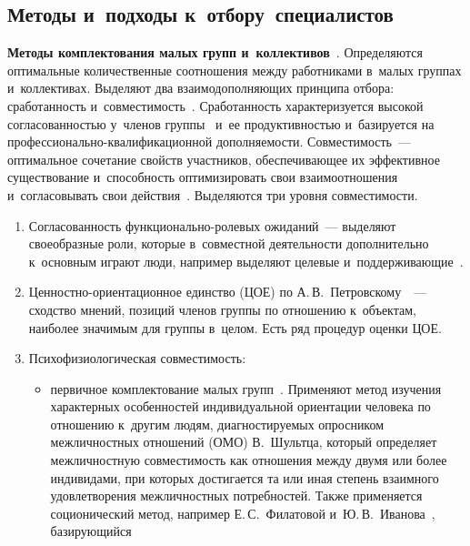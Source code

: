 \begin{multicols}{2}
\section{Методы и~подходы к~отбору~специалистов }

  \textbf{Методы комплектования малых групп и~коллективов}~\cite{13-r}. 
Определяются оптимальные количественные соотношения между работниками 
в~малых группах и~коллективах. Выделяют два взаимодополняющих принципа 
отбора: сра\-бо\-тан\-ность и~со\-вмес\-ти\-мость~\cite{14-r}. Сра\-бо\-тан\-ность 
характеризуется высокой со\-гла\-со\-ван\-ностью у~членов группы~\cite{15-r} и~ее\linebreak 
про\-дук\-тив\-ностью и~базируется на  
про\-фес\-сио\-наль\-но-ква\-ли\-фи\-ка\-ци\-он\-ной до\-пол\-ня\-емости. 
Совместимость~--- оптимальное сочетание свойств участников, 
обес\-пе\-чи\-ва\-ющее их эффективное \mbox{существование} и~спо\-соб\-ность 
оптимизировать свои взаимоотношения и~согласовывать свои 
действия~\cite{15-r}. Выделяются три уровня со\-вмес\-ти\-мости.\\[-14pt]
  \begin{enumerate}[1.]
\item Согласованность функ\-ци\-о\-наль\-но-ро\-ле\-вых ожи\-да\-ний~--- выделяют 
своеобразные роли, которые в~совместной дея\-тель\-ности дополнительно 
к~основным играют люди, например выделяют целевые и~под\-дер\-жи\-ва\-ющие~\cite{16-r}.\\[-14pt]
\item Ценностно-ори\-ен\-та\-ци\-он\-ное единст\-во (ЦОЕ) по 
А.\,В.~Петровскому~\cite{17-r}~--- сход\-ст\-во мнений, позиций членов группы 
по отношению к~объектам, наиболее значимым для группы в~целом. Есть ряд 
процедур оценки ЦОЕ.\\[-14pt]
\item Психофизиологическая со\-вмес\-ти\-мость:\\[-14pt]
\begin{itemize}
\item первичное комплектование малых групп~\cite{18-r}. Применяют метод 
изуче\-ния характерных особенностей индивидуальной ориентации человека по 
отношению к~другим людям, диагностируемых опросником межличностных 
отношений (ОМО) В.~Шультца, который определяет межличностную 
со\-вмес\-ти\-мость как отношения между двумя или более индивидами, при 
которых достигается та или иная степень взаимного удовле\-тво\-ре\-ния 
меж\-лич\-ност\-ных по\-треб\-но\-стей. Так\-же применяется соционический метод, 
например Е.\,С.~Филатовой и~Ю.\,В.~Иванова~\cite{19-r, 20-r}, ба\-зи\-ру\-ющий\-ся 

\end{itemize}
\end{enumerate}
\end{multicols}

